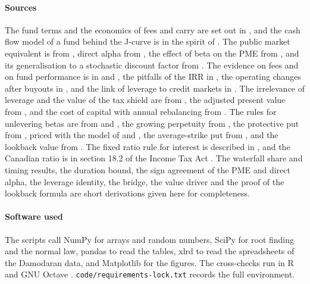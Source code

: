 \begin{chapterrefs}
\paragraph{Sources}
The fund terms and the economics of fees and carry are set out in \textcite{metrick2010}, and the
cash flow model of a fund behind the J-curve is in the spirit of \textcite{takahashi2002}. The public
market equivalent is from \textcite{kaplan2005}, direct alpha from \textcite{gredil2023}, the effect of
beta on the PME from \textcite{sorensen2015}, and its generalisation to a stochastic discount factor
from \textcite{korteweg2016}. The evidence on fees and on fund performance is in
\textcite{phalippou2009} and \textcite{harris2014}, the pitfalls of the IRR in \textcite{phalippou2008}, the operating changes after
buyouts in \textcite{kaplan1989}, and the link of leverage to credit markets in \textcite{axelson2013}.
The irrelevance of leverage and the value of the tax shield are from \textcite{modigliani1958,modigliani1963},
the adjusted present value from \textcite{myers1974}, and the cost of capital with annual rebalancing from
\textcite{miles1980}. The rules for unlevering betas are from \textcite{hamada1972} and \textcite{harris1985},
the growing perpetuity from \textcite{gordon1956}, the protective put from \textcite{chaffe1993}, priced
with the model of \textcite{black1973} and \textcite{merton1973}, the average-strike put from
\textcite{finnerty2012}, and the lookback value from \textcite{longstaff1995}. The fixed ratio rule for
interest is described in \textcite{oecd2015}, and the Canadian ratio is in section 18.2 of the
Income Tax Act \parencite{ita182}. The waterfall share and timing results, the duration bound, the sign agreement
of the PME and direct alpha, the leverage identity, the bridge, the value driver and the proof of the
lookback formula are short derivations given here for completeness.

\paragraph{Software used}
The scripts call NumPy \parencite{numpy} for arrays and random numbers, SciPy \parencite{scipy} for root
finding and the normal law, pandas \parencite{pandas} to read the tables, xlrd \parencite{xlrd} to read the
spreadsheets of the Damodaran data, and Matplotlib \parencite{matplotlib} for the figures. The
cross-checks run in R \parencite{rcore} and GNU Octave \parencite{octave}.
\texttt{code/requirements-lock.txt} records the full environment.


\end{chapterrefs}
